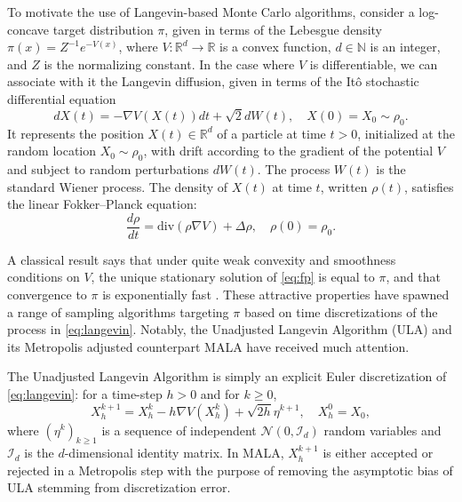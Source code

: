 \documentclass[final,12pt]{colt2018}
\begin{document}
To motivate the use of Langevin-based Monte Carlo algorithms, consider a log-concave target distribution $\pi$, given in terms of the Lebesgue density $\pi(x) = Z^{-1}e^{-V(x)}$, where $V:\mathbb{R}^d \to \mathbb{R}$ is a convex function, $d\in \mathbb{N}$ is an integer, and $Z$ is the normalizing constant. In the case where $V$ is differentiable, we can associate with it the Langevin diffusion, given in terms of the It\^o stochastic differential equation
\begin{equation}\label{eq:langevin}
dX(t) = -\nabla V(X(t))dt +  \sqrt{2}dW(t), \quad X(0) = X_0 \sim \rho_0.
\end{equation}
It represents the position $X(t) \in \mathbb{R}^d$ of a particle at time $t >0$, initialized at the random location $X_0 \sim \rho_0$, with drift according to the gradient of the potential $V$ and subject to random perturbations $dW(t)$. The process $W(t)$ is the standard Wiener process. The density of $X(t)$ at time $t$, written $\rho(t)$, satisfies the linear Fokker--Planck equation:
\begin{equation}\label{eq:fp}
\frac{d\rho}{dt} = \text{div}(\rho \nabla V) + \Delta \rho, \quad \rho(0) = \rho_0.
\end{equation}

A classical result says that under quite weak convexity and smoothness conditions on $V$, the unique stationary solution of \eqref{eq:fp} is equal to $\pi$, and that convergence to $\pi$ is exponentially fast \citep[see for example][Chapter 4]{pavliotis2014stochastic}. These attractive properties have spawned a range of sampling algorithms targeting $\pi$ based on time discretizations of the process in \eqref{eq:langevin}. Notably, the Unadjusted Langevin Algorithm (ULA) and its Metropolis adjusted counterpart MALA have received much attention.

The Unadjusted Langevin Algorithm is simply an explicit Euler discretization of \eqref{eq:langevin}: for a time-step $h> 0$ and for $k \geq 0$,
\begin{equation}
X_h^{k+1} = X_h^{k} - h\nabla V(X_h^{k}) + \sqrt{2h}\eta^{k+1}, \quad X_h^{0} = X_0,
\end{equation} 
where $(\eta^{k})_{k\geq 1}$ is a sequence of independent $\mathcal{N}(0,\mathcal{I}_d)$ random variables and $\mathcal{I}_d$ is the $d$-dimensional identity matrix. In MALA, $X_h^{k+1}$ is either accepted or rejected in a Metropolis step with the purpose of removing the asymptotic bias of ULA stemming from discretization error.
\end{document}
